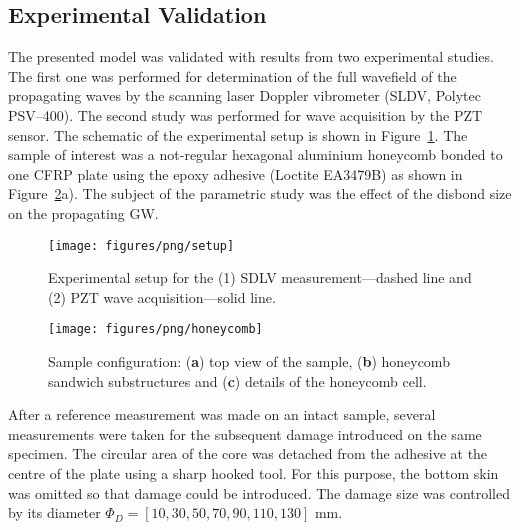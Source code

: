 \documentclass[sensors,article,accept,moreauthors,pdftex]{Definitions/mdpi}
\begin{document}
\begin{paracol}{2}
\section{Experimental Validation}
The presented model was validated with results from two
experimental studies.
The first one was performed for determination of the full wavefield of the propagating waves by the scanning laser Doppler vibrometer (SLDV, Polytec PSV–400).
The second study was performed for wave acquisition by the PZT sensor.
The schematic of the experimental setup is shown in Figure~\ref{fig:setup}.
The sample of interest was a not-regular hexagonal aluminium honeycomb bonded to one CFRP plate  using the epoxy adhesive (Loctite EA3479B) as shown in Figure~\ref{fig:honeycomb}a).
The subject of the parametric study was the effect of the disbond size on the propagating GW.

\vspace{-6pt}
\begin{figure}[H]
		\texttt{[image: figures/png/setup]}
	\caption{Experimental setup for the (1) SDLV measurement---dashed line and (2) PZT wave acquisition---solid line.}
	\label{fig:setup}
\end{figure}
\vspace{-12pt}
\begin{figure}[H]
		\texttt{[image: figures/png/honeycomb]}
	\caption{Sample configuration: (\textbf{a}) top view of the sample, (\textbf{b}) honeycomb sandwich substructures and (\textbf{c}) details of the honeycomb cell.}
	\label{fig:honeycomb}
\end{figure}


After a reference measurement was made on an intact sample, several measurements were taken for the subsequent damage introduced on the same specimen.
The circular area of the core was detached from the adhesive at the centre of the plate using a sharp hooked tool.
For this purpose, the bottom skin was omitted so that damage could be introduced.
The damage size was controlled by its diameter \(\Phi_D=\left [10, 30, 50, 70, 90, 110, 130 \right ]\) mm.


\end{paracol}
\end{document}
